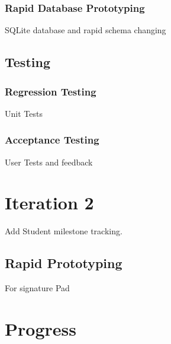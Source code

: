 \documentclass{journal}
\begin{document}
\subsubsection{Rapid Database Prototyping}
SQLite database and rapid schema changing
\subsection{Testing}
\subsubsection{Regression Testing}
Unit Tests
\subsubsection{Acceptance Testing}
User Tests and feedback
\newpage
\section{Iteration 2}
Add Student milestone tracking.
\subsection{Rapid Prototyping}
For signature Pad
\section{Progress}
\end{document}

